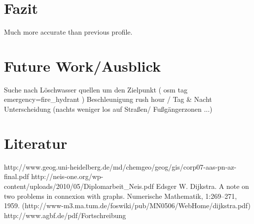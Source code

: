 \documentclass[10pt,a4paper]{article}
\begin{document}
\section{Fazit}

Much more accurate than previous profile. 

\section{Future Work/Ausblick}

Suche nach Löschwasser quellen um den Zielpunkt ( osm tag emergency=fire_hydrant )
Beschleunigung
rush hour / Tag & Nacht Unterscheidung (nachts weniger los auf Straßen/ Fußgängerzonen ...)



\section{Literatur}

http://www.geog.uni-heidelberg.de/md/chemgeo/geog/gis/corp07-aas-pn-az-final.pdf
http://neis-one.org/wp-content/uploads/2010/05/Diplomarbeit_Neis.pdf
Edsger W. Dijkstra. A note on two problems in connexion with graphs. Numerische Mathematik,
1:269–271, 1959. (http://www-m3.ma.tum.de/foswiki/pub/MN0506/WebHome/dijkstra.pdf)
http://www.agbf.de/pdf/Fortschreibung%
\end{document}
